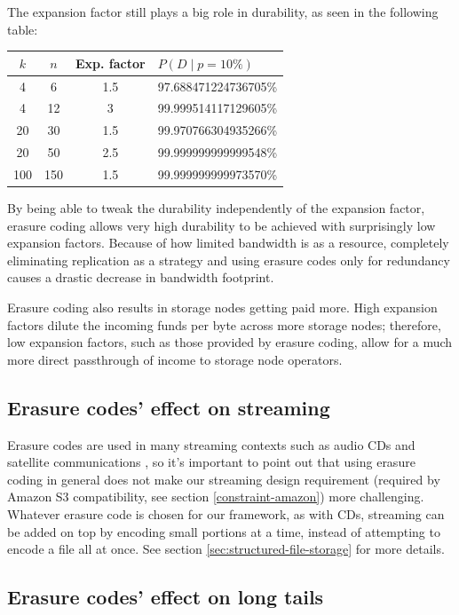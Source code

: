 \documentclass[8pt,fleqn,openany]{book}
\begin{document}
The expansion factor still plays a big role in durability, as seen in the
following table:

\begin{center}
\begin{tabular}{c c c l}
$k$ & $n$ & Exp. factor & $P(D \mid p = 10\%)$ \\ \hline
4 & 6 & 1.5 & 97.688471224736705\%\\
4 & 12 & 3 & 99.999514117129605\%\\
20 & 30 & 1.5 & 99.970766304935266\%\\
20 & 50 & 2.5 & 99.999999999999548\%\\
100 & 150 & 1.5 & 99.999999999973570\%\\
\end{tabular}
\end{center}

By being able to tweak the durability independently of the expansion factor,
erasure coding allows very high durability to be achieved with surprisingly
low expansion factors.
Because of how limited bandwidth is as a resource, completely eliminating
replication as a
strategy and using erasure codes only for redundancy causes a drastic
decrease in bandwidth footprint.

Erasure coding also results in storage nodes getting paid more.
High expansion factors dilute the incoming funds per byte across more storage
nodes; therefore, low expansion factors, such as those provided by erasure
coding, allow for a much more direct passthrough of income to storage node
operators.

\subsection{Erasure codes' effect on streaming}

Erasure codes are used in many streaming contexts such as audio CDs and
satellite communications \cite{rs-cd},
so it's important to point out that using erasure coding in general does not
make our streaming design requirement (required by Amazon S3 compatibility,
see section \ref{constraint-amazon}) more challenging.
Whatever erasure code is chosen for our framework, as with CDs, streaming can
be added on top by encoding small portions at a time, instead of attempting to
encode a file all at once. See section \ref{sec:structured-file-storage} for
more details.

\subsection{Erasure codes' effect on long tails}\label{sec:long-tail}
\end{document}

